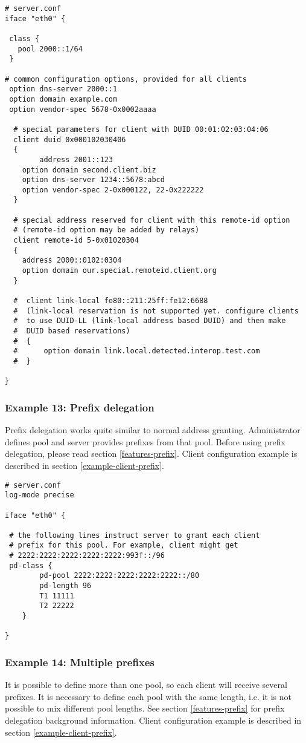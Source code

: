 \begin{lstlisting}
# server.conf
iface "eth0" {

 class {
   pool 2000::1/64
 }

# common configuration options, provided for all clients
 option dns-server 2000::1
 option domain example.com
 option vendor-spec 5678-0x0002aaaa

  # special parameters for client with DUID 00:01:02:03:04:06      
  client duid 0x000102030406 
  {
        address 2001::123
	option domain second.client.biz
	option dns-server 1234::5678:abcd
	option vendor-spec 2-0x000122, 22-0x222222
  }

  # special address reserved for client with this remote-id option
  # (remote-id option may be added by relays)  
  client remote-id 5-0x01020304
  {
	address 2000::0102:0304
	option domain our.special.remoteid.client.org
  }

  #  client link-local fe80::211:25ff:fe12:6688
  #  (link-local reservation is not supported yet. configure clients
  #  to use DUID-LL (link-local address based DUID) and then make
  #  DUID based reservations)
  #  {
  #      option domain link.local.detected.interop.test.com
  #  } 
 
}
\end{lstlisting}

\subsubsection{Example 13: Prefix delegation}
\label{example-server-prefix}

Prefix delegation works quite similar to normal address granting.
Administrator defines pool and server provides prefixes from that
pool. Before using prefix delegation, please read section
\ref{features-prefix}. Client configuration example is described in section 
\ref{example-client-prefix}.

\begin{lstlisting}
# server.conf
log-mode precise

iface "eth0" {
 
 # the following lines instruct server to grant each client
 # prefix for this pool. For example, client might get
 # 2222:2222:2222:2222:2222:993f::/96
 pd-class {
        pd-pool 2222:2222:2222:2222:2222::/80
        pd-length 96
        T1 11111
        T2 22222
    }
 
}
\end{lstlisting}

\subsubsection{Example 14: Multiple prefixes}
\label{example-server-prefixes}
It is possible to define more than one pool, so each client will
receive several prefixes. It is necessary to define each pool with the
same length, i.e. it is not possible to mix different pool lengths.
See section \ref{features-prefix} for prefix delegation background
information. Client configuration example is described in section 
\ref{example-client-prefix}.

